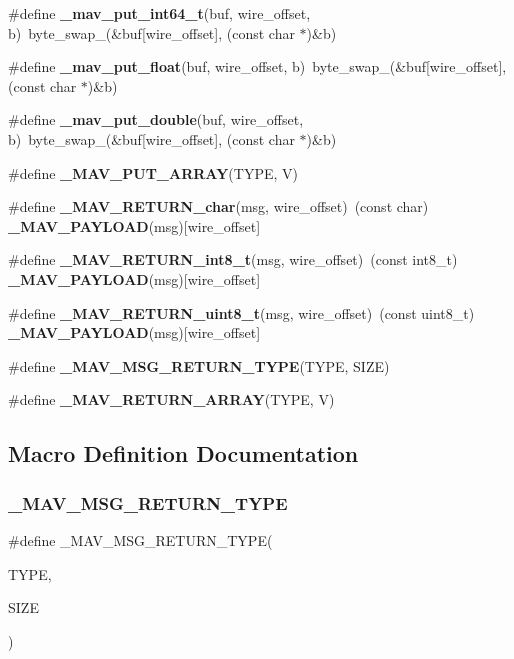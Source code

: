 \begin{DoxyCompactItemize}
\item 
\#define \textbf{ \+\_\+mav\+\_\+put\+\_\+int64\+\_\+t}(buf,  wire\+\_\+offset,  b)~byte\+\_\+swap\+\_(\&buf[wire\+\_\+offset], (const char $\ast$)\&b)
\item 
\#define \textbf{ \+\_\+mav\+\_\+put\+\_\+float}(buf,  wire\+\_\+offset,  b)~byte\+\_\+swap\+\_(\&buf[wire\+\_\+offset], (const char $\ast$)\&b)
\item 
\#define \textbf{ \+\_\+mav\+\_\+put\+\_\+double}(buf,  wire\+\_\+offset,  b)~byte\+\_\+swap\+\_(\&buf[wire\+\_\+offset], (const char $\ast$)\&b)
\item 
\#define \textbf{ \+\_\+\+M\+A\+V\+\_\+\+P\+U\+T\+\_\+\+A\+R\+R\+AY}(T\+Y\+PE,  V)
\item 
\#define \textbf{ \+\_\+\+M\+A\+V\+\_\+\+R\+E\+T\+U\+R\+N\+\_\+char}(msg,  wire\+\_\+offset)~(const char)\textbf{ \+\_\+\+M\+A\+V\+\_\+\+P\+A\+Y\+L\+O\+AD}(msg)[wire\+\_\+offset]
\item 
\#define \textbf{ \+\_\+\+M\+A\+V\+\_\+\+R\+E\+T\+U\+R\+N\+\_\+int8\+\_\+t}(msg,  wire\+\_\+offset)~(const int8\+\_\+t)\textbf{ \+\_\+\+M\+A\+V\+\_\+\+P\+A\+Y\+L\+O\+AD}(msg)[wire\+\_\+offset]
\item 
\#define \textbf{ \+\_\+\+M\+A\+V\+\_\+\+R\+E\+T\+U\+R\+N\+\_\+uint8\+\_\+t}(msg,  wire\+\_\+offset)~(const uint8\+\_\+t)\textbf{ \+\_\+\+M\+A\+V\+\_\+\+P\+A\+Y\+L\+O\+AD}(msg)[wire\+\_\+offset]
\item 
\#define \textbf{ \+\_\+\+M\+A\+V\+\_\+\+M\+S\+G\+\_\+\+R\+E\+T\+U\+R\+N\+\_\+\+T\+Y\+PE}(T\+Y\+PE,  S\+I\+ZE)
\item 
\#define \textbf{ \+\_\+\+M\+A\+V\+\_\+\+R\+E\+T\+U\+R\+N\+\_\+\+A\+R\+R\+AY}(T\+Y\+PE,  V)
\end{DoxyCompactItemize}


\subsection{Macro Definition Documentation}
\mbox{\label{protocol_8h_a148ead634653eb40dfa0644f11336d24}} 
\subsubsection{\+\_\+\+M\+A\+V\+\_\+\+M\+S\+G\+\_\+\+R\+E\+T\+U\+R\+N\+\_\+\+T\+Y\+PE}
{\footnotesize\ttfamily \#define \+\_\+\+M\+A\+V\+\_\+\+M\+S\+G\+\_\+\+R\+E\+T\+U\+R\+N\+\_\+\+T\+Y\+PE(\begin{DoxyParamCaption}\item[{}]{T\+Y\+PE,  }\item[{}]{S\+I\+ZE }\end{DoxyParamCaption})}

